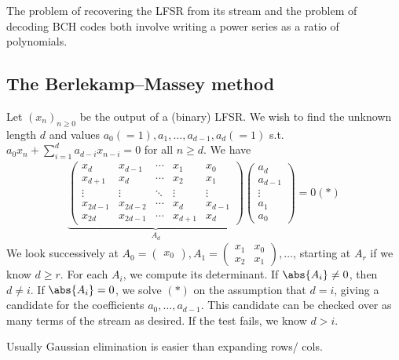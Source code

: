 \begin{remark}
    The problem of recovering the LFSR from its stream and the problem of decoding BCH codes both involve writing a power series as a ratio of polynomials.
\end{remark}

\subsection{The Berlekamp--Massey method}
Let $(x_n)_{n \geq 0}$ be the output of a (binary) LFSR.
We wish to find the unknown length $d$ and values $a_0 (=1), a_1, \dots, a_{d-1}, a_d(=1)$ s.t. $a_0 x_n + \sum_{i=1}^d a_{d-i} x_{n-i} = 0$ for all $n \geq d$.
We have
\begin{align*}
    \underbrace{\begin{pmatrix}
        x_d & x_{d-1} & \cdots & x_1 & x_0 \\
        x_{d+1} & x_d & \cdots & x_2 & x_1 \\
        \vdots & \vdots & \ddots & \vdots & \vdots \\
        x_{2d-1} & x_{2d-2} & \cdots & x_d & x_{d-1} \\
        x_{2d} & x_{2d-1} & \cdots & x_{d+1} & x_d
    \end{pmatrix}}_{A_d} \begin{pmatrix}
        a_d \\
        a_{d-1} \\
        \vdots \\
        a_1 \\
        a_0
    \end{pmatrix} = 0 (\ast)
\end{align*}
We look successively at $A_0 = \begin{pmatrix}
    x_0
\end{pmatrix}, A_1 = \begin{pmatrix}
    x_1 & x_0 \\
    x_2 & x_1
\end{pmatrix}, \dots$, starting at $A_r$ if we know $d \geq r$.
For each $A_i$, we compute its determinant.
If $\abs{A_i} \neq 0$, then $d \neq i$.
If $\abs{A_i} = 0$, we solve $(\ast)$ on the assumption that $d = i$, giving a candidate for the coefficients $a_0, \dots, a_{d-1}$.
This candidate can be checked over as many terms of the stream as desired.
If the test fails, we know $d > i$.

\begin{remark}
    Usually Gaussian elimination is easier than expanding rows/ cols.
\end{remark}